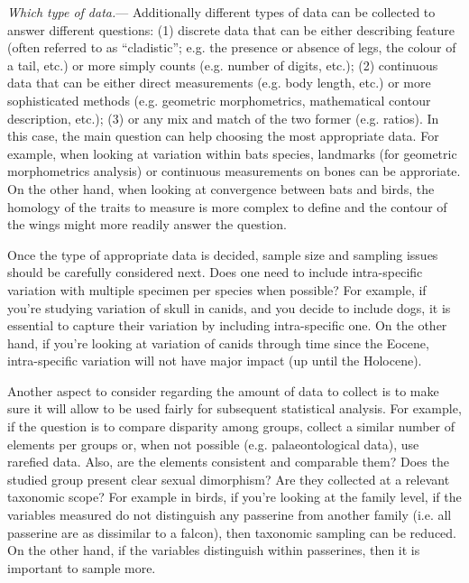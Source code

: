 \documentclass[12pt,letterpaper]{article}
\renewcommand{\subsubsection}[1]{%
\vspace{2ex}
\noindent
\textit{#1.}---}
\begin{document}
\subsubsection{Which type of data}
Additionally different types of data can be collected to answer different questions:
(1) discrete data that can be either describing feature (often referred to as ``cladistic''; e.g. the presence or absence of legs, the colour of a tail, etc.) or more simply counts (e.g. number of digits, etc.);
(2) continuous data that can be either direct measurements (e.g. body length, etc.) or more sophisticated methods (e.g. geometric morphometrics, mathematical contour description, etc.);
(3) or any mix and match of the two former (e.g. ratios).
In this case, the main question can help choosing the most appropriate data.
For example, when looking at variation within bats species, landmarks (for geometric morphometrics analysis) or continuous measurements on bones can be approriate.
On the other hand, when looking at convergence between bats and birds, the homology of the traits to measure is more complex to define and the contour of the wings might more readily answer the question.

Once the type of appropriate data is decided, sample size and sampling issues should be carefully considered next.
Does one need to include intra-specific variation with multiple specimen per species when possible?
For example, if you're studying variation of skull in canids, and you decide to include dogs, it is essential to capture their variation by including intra-specific one.
On the other hand, if you're looking at variation of canids through time since the Eocene, intra-specific variation will not have major impact (up until the Holocene). %

Another aspect to consider regarding the amount of data to collect is to make sure it will allow to be used fairly for subsequent statistical analysis.
For example, if the question is to compare disparity among groups, collect a similar number of elements per groups or, when not possible (e.g. palaeontological data), use rarefied data.
Also, are the elements consistent and comparable them?
Does the studied group present clear sexual dimorphism?
Are they collected at a relevant taxonomic scope?
For example in birds, if you're looking at the family level, if the variables measured do not distinguish any passerine from another family (i.e. all passerine are as dissimilar to a falcon), then taxonomic sampling can be reduced. On the other hand, if the variables distinguish within passerines, then it is important to sample more.
\end{document}
